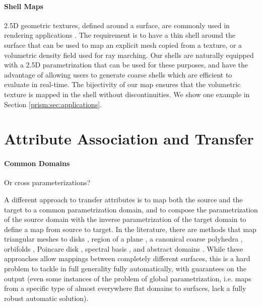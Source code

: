 \paragraph{Shell Maps}
2.5D geometric textures, defined around a surface, are commonly used in rendering applications \cite{wang2003view,wang2004generalized,porumbescu2005shell,peng2004interactive,lengyel2001real,chen2004shell,huang2007gradient,jin2019shell}. The requirement is to have a thin shell around the surface that can be used to map an explicit mesh copied from a texture, or a volumetric density field used for ray marching. Our shells are naturally equipped with a 2.5D parametrization that can be used for these purposes, and have the advantage of allowing users to  generate coarse shells which are efficient to evaluate in real-time. The bijectivity of our map ensures that the  volumetric texture is mapped in the shell without discontinuities. We show one example in Section \ref{prism:sec:applications}.

\section{Attribute Association and Transfer}
\paragraph{Common Domains}
Or cross parameterizations?

A different approach to transfer attributes is to map both the source and the target to a common parametrization domain, and to compose the parametrization of the source domain with the inverse parametrization of the target domain to define a map from source to target. In the literature, there are methods that map triangular meshes to disks \cite{Tutte:1963,Floater:97}, region of a plane 
\cite{maron2017convolutional,Aigerman:2015b,Aigerman:2014,Schuller:2013,Smith:2015,rabinovich2017scalable,jiang2017simplicial,Weber:2014:LIP,Campen:2016,Muller:2015,Gotsman:2001,surazhsky2001morphing,Zhang:2005,Fu:2016,litke2005image,schmidt2019distortion}, a canonical coarse polyhedra \cite{kraevoy2004cross,praun2001consistent}, orbifolds \cite{Aigerman:2015,Aigerman:2017,Aigerman:2016}, Poincare disk \cite{Springborn:2008,stephenson2005introduction,Kharevych:2006,Jin:2008}, spectral basis \cite{Ovsjanikov:2012,Shoham:2019,Ovsjanikov:2017}, and abstract domains \cite{kraevoy2004cross,Schreiner:2004,Pietroni:2010}.
While these approaches allow mappings between completely different surfaces, this is a hard problem to tackle in full generality fully automatically, with guarantees on the output (even some instances of the problem of global parametrization, i.e. maps from a specific type of almost everywhere flat domains to surfaces, lack a fully robust automatic solution).

